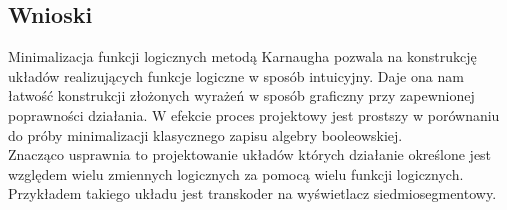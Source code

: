 \documentclass{article}
\begin{document}
        \subsection{Wnioski}
            Minimalizacja funkcji logicznych metodą Karnaugha pozwala na konstrukcję układów realizujących funkcje logiczne w sposób intuicyjny. Daje ona nam łatwość konstrukcji złożonych wyrażeń w sposób graficzny przy zapewnionej poprawności działania. W efekcie proces projektowy jest prostszy w porównaniu do próby minimalizacji klasycznego zapisu algebry booleowskiej.\\
            Znacząco usprawnia to projektowanie układów których działanie określone jest względem wielu zmiennych logicznych za pomocą wielu funkcji logicznych. Przykładem takiego układu jest transkoder na wyświetlacz siedmiosegmentowy.\\
\end{document}
